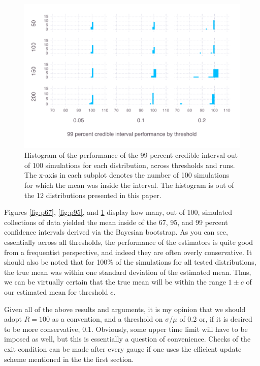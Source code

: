 \begin{figure}[hbt]
  \includegraphics{chapters/Benchmarking/p99ci}
  \caption{Histogram of the performance of the 99 percent credible interval out of 100 simulations for each distribution, across thresholds and runs. The x-axis in each subplot denotes the number of 100 simulations for which the mean was inside the interval. The histogram is out of the 12 distributions presented in this paper.}
    \label{fig:p99}
\end{figure}


Figures \ref{fig:p67}, \ref{fig:p95}, and \ref{fig:p99} display how many, out of 100, simulated collections of data yielded the mean inside of the 67, 95, and 99 percent confidence intervals derived via the Bayesian bootstrap. As you can see, essentially across all thresholds, the performance of the estimators is quite good from a frequentist perspective, and indeed they are often overly conservative. It should also be noted that for 100$\%$ of the simulations for all tested distributions, the true mean was within one standard deviation of the estimated mean. Thus, we can be virtually certain that the true mean will be within the range $1\pm c$ of our estimated mean for threshold $c$.

Given all of the above results and arguments, it is my opinion that we should adopt $R=100$ as a convention, and a threshold on $\sigma/\mu$ of 0.2 or, if it is desired to be more conservative, 0.1. Obviously, some upper time limit will have to be imposed as well, but this is essentially a question of convenience. Checks of the exit condition can be made after every gauge if one uses the efficient update scheme mentioned in the the first section.

